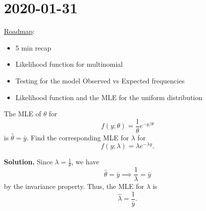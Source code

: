 \section{2020-01-31}
\underline{Roadmap}:
\begin{itemize}
    \item 5 min recap
    \item Likelihood function for multinomial
    \item Testing for the model
          \subitem Observed vs Expected frequencies
    \item Likelihood function and the MLE for the uniform distribution
\end{itemize}

\begin{exbox}
    \begin{example}
        The MLE of $ \theta $ for
        \[ f(y;\theta)=\frac{1}{\theta}e^{-y/\theta}  \]
        is $ \hat{\theta}=\bar{y} $. Find the corresponding MLE for
        $ \lambda $ for
        \[ f(y;\lambda)=\lambda e^{-\lambda y}. \]

        \textbf{Solution.} Since $ \lambda=\frac{1}{\theta} $, we have
        \[ \hat{\theta}=\bar{y}\implies \frac{1}{\lambda}=\bar{y} \]
        by the invariance property.
        Thus, the MLE for $ \lambda $ is
        \[ \hat{\lambda}=\frac{1}{\bar{y}}. \]
    \end{example}
\end{exbox}


